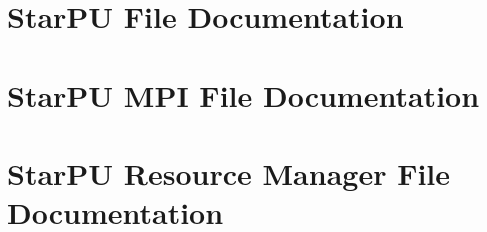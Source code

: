 \chapter{StarPU File Documentation}



















































































\chapter{StarPU MPI File Documentation}





















\chapter{StarPU Resource Manager File Documentation}



